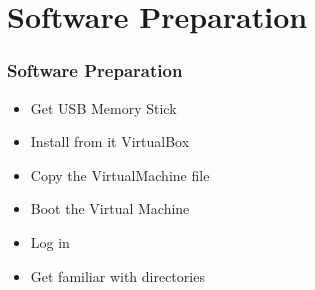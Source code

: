 \section{Software Preparation}


\begin{frame}
\frametitle{Software Preparation}
\begin{itemize}
\item Get USB Memory Stick
\pause
\item Install from it VirtualBox
\pause
\item Copy the VirtualMachine file
\pause
\item Boot the Virtual Machine
\pause
\item Log in
\pause
\item Get familiar with directories
\end{itemize}
\end{frame}


